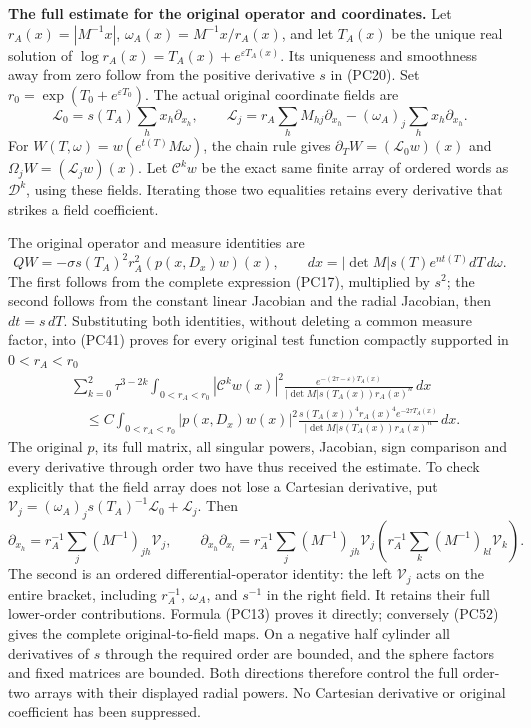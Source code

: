 \documentclass[
  11pt,
]{article}
\begin{document}
\textbf{The full estimate for the original operator and coordinates.}
Let \(r_A(x)=|M^{-1}x|\), \(\omega_A(x)=M^{-1}x/r_A(x)\), and let
\(T_A(x)\) be the unique real solution of
\(\log r_A(x)=T_A(x)+e^{\varepsilon T_A(x)}\). Its uniqueness and
smoothness away from zero follow from the positive derivative \(s\) in
(PC20). Set \(r_0=\exp(T_0+e^{\varepsilon T_0})\). The actual original
coordinate fields are \[
 \mathcal L_0=s(T_A)\sum_hx_h\partial_{x_h},\qquad
 \mathcal L_j=r_A\sum_hM_{hj}\partial_{x_h}
                    -(\omega_A)_j\sum_hx_h\partial_{x_h}.
 \tag{PC52}
\] For \(W(T,\omega)=w(e^{t(T)}M\omega)\), the chain rule gives
\(\partial_TW=(\mathcal L_0w)(x)\) and \(\Omega_jW=(\mathcal L_jw)(x)\).
Let \(\mathcal C^kw\) be the exact same finite array of ordered words as
\(\mathscr D^k\), using these fields. Iterating those two equalities
retains every derivative that strikes a field coefficient.

The original operator and measure identities are \[
 QW=-\sigma s(T_A)^2r_A^2(p(x,D_x)w)(x),\qquad
 dx=|\det M|s(T) e^{nt(T)}dT\,d\omega.
 \tag{PC53}
\] The first follows from the complete expression (PC17), multiplied by
\(s^2\); the second follows from the constant linear Jacobian and the
radial Jacobian, then \(dt=s\,dT\). Substituting both identities,
without deleting a common measure factor, into (PC41) proves for every
original test function compactly supported in \(0<r_A<r_0\) \[
 \begin{split}
 &\sum_{k=0}^2\tau^{3-2k}\int_{0<r_A<r_0}
 |\mathcal C^kw(x)|^2
 \frac{e^{-(2\tau-\varepsilon)T_A(x)}}
      {|\det M|s(T_A(x))r_A(x)^n}\,dx\\
 &\quad\leq C\int_{0<r_A<r_0}|p(x,D_x)w(x)|^2
 \frac{s(T_A(x))^4r_A(x)^4e^{-2\tau T_A(x)}}
      {|\det M|s(T_A(x))r_A(x)^n}\,dx.
 \end{split}                                                   \tag{PC54}
\] The original \(p\), its full matrix, all singular powers, Jacobian,
sign comparison and every derivative through order two have thus
received the estimate. To check explicitly that the field array does not
lose a Cartesian derivative, put
\(\mathcal V_j=(\omega_A)_js(T_A)^{-1}\mathcal L_0+\mathcal L_j\). Then
\[
 \partial_{x_h}=r_A^{-1}\sum_j(M^{-1})_{jh}\mathcal V_j,
 \qquad
 \partial_{x_h}\partial_{x_l}
 =r_A^{-1}\sum_j(M^{-1})_{jh}\mathcal V_j
       \left(r_A^{-1}\sum_k(M^{-1})_{kl}\mathcal V_k\right).
 \tag{PC55}
\] The second is an ordered differential-operator identity: the left
\(\mathcal V_j\) acts on the entire bracket, including \(r_A^{-1}\),
\(\omega_A\), and \(s^{-1}\) in the right field. It retains their full
lower-order contributions. Formula (PC13) proves it directly; conversely
(PC52) gives the complete original-to-field maps. On a negative half
cylinder all derivatives of \(s\) through the required order are
bounded, and the sphere factors and fixed matrices are bounded. Both
directions therefore control the full order-two arrays with their
displayed radial powers. No Cartesian derivative or original coefficient
has been suppressed.
\end{document}
